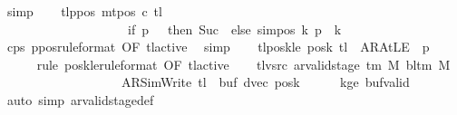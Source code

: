 \begin{isabellebody}
\ simp\isanewline
\ \ \isamarkupfalse%
\ tl{\isacharunderscore}{\kern0pt}ppos{\isacharcolon}{\kern0pt}\ {\isachardoublequoteopen}mt{\isacharunderscore}{\kern0pt}pos\ c{}\ {\isacharquery}{\kern0pt}tl\isanewline
\ \ \ \ \ \ \ \ \ \ \ \ \ \ \ \ \ \ \ {\isacharequal}{\kern0pt}\ {\isacharparenleft}{\kern0pt}if\ {\isacharquery}{\kern0pt}p\ {\isacharequal}{\kern0pt}\ {}\ then\ Suc\ {}\ else\ sim{\isacharunderscore}{\kern0pt}pos\ {\isacharquery}{\kern0pt}k\ {\isacharquery}{\kern0pt}p\ {\isacharplus}{\kern0pt}\ {\isacharquery}{\kern0pt}k{\isacharparenright}{\kern0pt}{\isachardoublequoteclose}\isanewline
\ \ \ \ \isamarkupfalse%
\ c{}{\isacharunderscore}{\kern0pt}ps\ ppos{\isacharbrackleft}{\kern0pt}rule{\isacharunderscore}{\kern0pt}format{\isacharcomma}{\kern0pt}\ OF\ tl{\isacharunderscore}{\kern0pt}active{\isacharbrackright}{\kern0pt}\ \isamarkupfalse%
\ simp\isanewline
\ \ \isamarkupfalse%
\ tl{\isacharunderscore}{\kern0pt}poskle{\isacharcolon}{\kern0pt}\ {\isachardoublequoteopen}posk\ {\isacharquery}{\kern0pt}tl\ {\isacharequal}{\kern0pt}\ AR{\isacharunderscore}{\kern0pt}AtLE\ {\isasymlongleftrightarrow}\ {\isacharquery}{\kern0pt}p\ {\isacharequal}{\kern0pt}\ {}{\isachardoublequoteclose}\isanewline
\ \ \ \ \isamarkupfalse%
\ {\isacharparenleft}{\kern0pt}rule\ poskle{\isacharbrackleft}{\kern0pt}rule{\isacharunderscore}{\kern0pt}format{\isacharcomma}{\kern0pt}\ OF\ tl{\isacharunderscore}{\kern0pt}active{\isacharbrackright}{\kern0pt}{\isacharparenright}{\kern0pt}\isanewline
\ \ \isamarkupfalse%
\ tl{\isacharunderscore}{\kern0pt}vsrc{\isacharcolon}{\kern0pt}\ {\isachardoublequoteopen}ar{\isacharunderscore}{\kern0pt}valid{\isacharunderscore}{\kern0pt}stage\ {\isacharparenleft}{\kern0pt}{\isasymGamma}{\isacharunderscore}{\kern0pt}tm\ M{\isacharparenright}{\kern0pt}\ {\isacharparenleft}{\kern0pt}bl{\isacharunderscore}{\kern0pt}tm\ M{\isacharparenright}{\kern0pt}\isanewline
\ \ \ \ \ \ \ \ \ \ \ \ \ \ \ \ \ \ \ {\isacharparenleft}{\kern0pt}AR{\isacharunderscore}{\kern0pt}SimWrite{\isacharcomma}{\kern0pt}\ {\isacharquery}{\kern0pt}tl{\isacharcomma}{\kern0pt}\ {}{\isacharcomma}{\kern0pt}\ buf{\isacharcomma}{\kern0pt}\ dvec{\isacharcomma}{\kern0pt}\ posk{\isacharparenright}{\kern0pt}{\isachardoublequoteclose}\isanewline
\ \ \ \ \isamarkupfalse%
\ kge{}\ buf{\isacharunderscore}{\kern0pt}valid\ \isamarkupfalse%
\ {\isacharparenleft}{\kern0pt}auto\ simp{\isacharcolon}{\kern0pt}\ ar{\isacharunderscore}{\kern0pt}valid{\isacharunderscore}{\kern0pt}stage{\isacharunderscore}{\kern0pt}def{\isacharparenright}{\kern0pt}\isanewline

\end{isabellebody}

